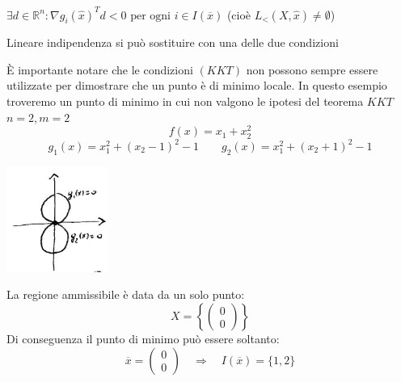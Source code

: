  \begin{defn}
   $\exists d \in \mathbb{R}^{n}:  \nabla g_i(\hat{x})^{T}d < 0
   \text{ per ogni } i \in I(\overline{x})$
   (cio\`e $ L_{<} (X, \hat{x}) \neq \emptyset$)
 \end{defn}

Lineare indipendenza si pu\`o sostituire con una delle due
condizioni

\begin{example}
\`E importante notare che le condizioni $(KKT)$ non possono sempre essere utilizzate per dimostrare che un punto è di minimo locale. In questo esempio troveremo un punto di minimo in cui non valgono le ipotesi del teorema $KKT$\\
$n=2, m=2$
$$ f(x) = x_1 + x_2^{2} $$
$$ g_1(x) = x_1^{2} + (x_2 -1)^{2} -1 \qquad
 g_2(x) = x_1^{2} + (x_2+1)^{2} -1 $$
 \begin{center}
   \includegraphics[width=0.25\textwidth]{imgs/ottvinc05.png}
 \end{center}
La regione ammissibile \`e data da un solo punto:
$$
X = \left\{
\begin{pmatrix}
0 \\
0
\end{pmatrix}
\right\}
$$
Di conseguenza il punto di minimo può essere soltanto:
$$
\overline{x} =
\begin{pmatrix}
0 \\
0
\end{pmatrix}
\quad \Longrightarrow \quad 
I(\overline{x}) = \{1, 2 \}
$$


\end{example}

